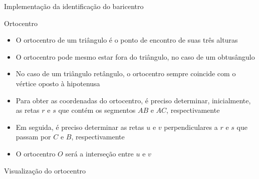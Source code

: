 \begin{frame}[fragile]{Implementação da identificação do baricentro}
\end{frame}

\begin{frame}[fragile]{Ortocentro}

    \begin{itemize}
        \item O ortocentro de um triângulo é o ponto de encontro de suas três alturas
        \pause

        \item O ortocentro pode mesmo estar fora do triângulo, no caso de um obtusângulo
        \pause

        \item No caso de um triângulo retângulo, o ortocentro sempre coincide com o vértice 
            oposto à hipotenusa
        \pause

        \item Para obter as coordenadas do ortocentro, é preciso determinar, inicialmente,
            as retas $r$ e $s$ que contém os segmentos $AB$ e $AC$,
            respectivamente
        \pause

        \item Em seguida, é preciso determinar as retas $u$ e $v$ perpendiculares a 
            $r$ e $s$ que passam por $C$ e $B$, respectivamente
        \pause

        \item O ortocentro $O$ será a interseção entre $u$ e $v$
    \end{itemize}

\end{frame}

\begin{frame}[fragile]{Visualização do ortocentro}

    \begin{figure}
        \centering

    \end{figure}

\end{frame}


